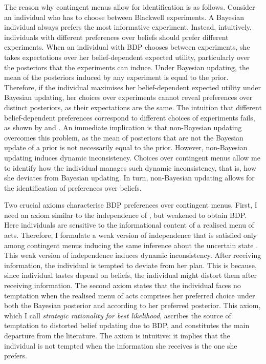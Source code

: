 The reason why contingent menus allow for identification is as follows. Consider an individual who has to choose between Blackwell experiments. A Bayesian individual always prefers the most informative experiment. Instead, intuitively, individuals with different preferences over beliefs should prefer different experiments. When an individual with BDP chooses between experiments, she takes expectations over her belief-dependent expected utility, particularly over the posteriors that the experiments can induce. Under Bayesian updating, the mean of the posteriors induced by any experiment is equal to the prior. Therefore, if the individual maximises her belief-dependent expected utility under Bayesian updating, her choices over experiments cannot reveal preferences over distinct posteriors, as their expectations are the same. The intuition that different belief-dependent preferences correspond to different choices of experiments fails, as shown by \cite{eliazCanAnticipatoryFeelings2006} and \cite{liangInformationdependentExpectedUtility2017}. An immediate implication is that non-Bayesian updating overcomes this problem, as the mean of posteriors that are not the Bayesian update of a prior is not necessarily equal to the prior. However, non-Bayesian updating induces dynamic inconsistency. Choices over contingent menus allow me to identify how the individual manages such dynamic inconsistency, that is, how she deviates from Bayesian updating. In turn, non-Bayesian updating allows for the identification of preferences over beliefs.

Two crucial axioms characterise BDP preferences over contingent menus. First, I need an axiom similar to the independence of \cite{vonneumannTheoryGamesEconomic2007}, but weakened to obtain BDP. Here individuals are sensitive to the informational content of a realised menu of acts. Therefore, I formulate a weak version of independence that is satisfied only among contingent menus inducing the same inference about the uncertain state \citep{liangInformationdependentExpectedUtility2017,rommeswinkelPreferenceKnowledge2023}. This weak version of independence induces dynamic inconsistency. After receiving information, the individual is tempted to deviate from her plan. This is because, since individual tastes depend on beliefs, the individual might distort them after receiving information. The second axiom states that the individual faces no temptation when the realised menu of acts comprises her preferred choice under both the Bayesian posterior and according to her preferred posterior. This axiom, which I call \textit{strategic rationality for best likelihood}, ascribes the source of temptation to distorted belief updating due to BDP, and constitutes the main departure from the literature. The axiom is intuitive: it implies that the individual is not tempted when the information she receives is the one she prefers.

